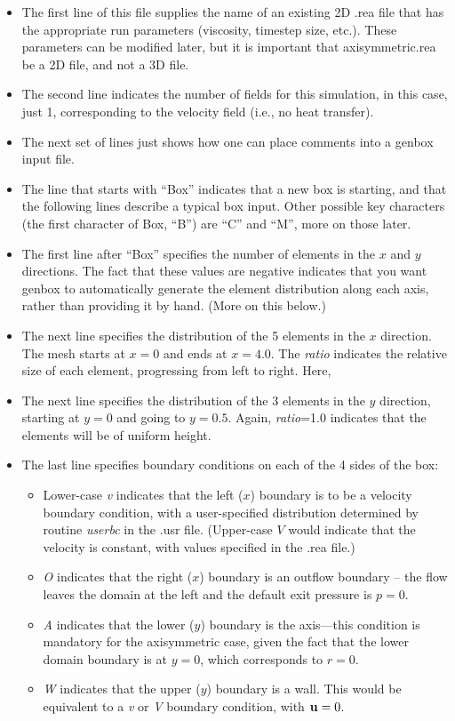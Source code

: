 \begin{itemize}
\item
The first line of this file supplies the name of an existing 2D .rea file
that has the appropriate run parameters (viscosity, timestep size, etc.).
These parameters can be modified later, but it is important that 
axisymmetric.rea be a 2D file, and not a 3D file.
\item
The second line indicates the number of fields for this simulation, in
this case, just 1, corresponding to the velocity field (i.e., no heat 
transfer).
\item
The next set of lines just shows how one can place comments into a genbox
input file.
\item
The line that starts with ``Box'' indicates that a new box is starting,
and that the following lines describe a typical box input.  Other possible
key characters (the first character of Box, ``B'') are ``C'' and ``M'',
more on those later.
\item
The first line after ``Box'' specifies the number of elements in the
\(x\) and \(y\) directions.   The fact that these values are negative indicates
that you want genbox to automatically generate the element distribution 
along each axis, rather than providing it by hand.  (More on this below.)
\item
The next line specifies the distribution of the 5 elements in the \(x\) direction.
The mesh starts at \(x=0\) and ends at \(x=4.0\).  The {\em ratio} indicates the
relative size of each element, progressing from left to right.  Here, 
\item
The next line specifies the distribution of the 3 elements in the \(y\) direction,
starting at \(y=0\) and going to \(y=0.5\).  Again, 
{\em ratio}=1.0 indicates that the elements will be of uniform height.
\item
The last line specifies boundary conditions on each of the 4 sides of the
box:  
\begin{itemize}
\item
Lower-case {\em v} indicates that the left (\(x\)) boundary is to be a velocity
boundary condition, with a user-specified distribution determined by 
routine {\em userbc} in the .usr file.  (Upper-case \(V\) would indicate that
the velocity is constant, with values specified in the .rea file.)
\item
{\em O} indicates that the right (\(x\)) boundary is an outflow boundary -- the
flow leaves the domain at the left and the default exit pressure is \(p=0\).
\item
{\em A} indicates that the lower (\(y\)) boundary is the axis---this condition
is mandatory for the axisymmetric case, given the fact that the lower domain
boundary is at \(y=0\), which corresponds to \(r=0\).
\item
{\em W} indicates that the upper (\(y\)) boundary is a wall.  This would be
equivalent to a {\em v} or {\em V} boundary condition, with \({\bf u}=0\).
\end{itemize}
\end{itemize}


